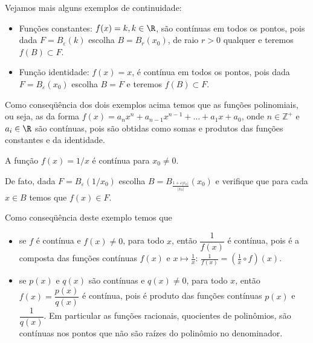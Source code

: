\documentclass{book}
\begin{document}
Vejamos mais alguns exemplos de continuidade:
\begin{itemize}
  \item Funções constantes: $f(x)=k, k\in\R$, são contínuas em todos os
  pontos, pois dada $F=B_\varepsilon(k)$ escolha $B=B_r(x_0)$, de raio
  $r>0$ qualquer e teremos $f(B)\subset F$.
  \item Função identidade: $f(x)=x$, é contínua em todos os pontos, pois
  dada $F=B_\varepsilon(x_0)$ escolha $B=F$ e teremos $f(B)\subset F$.
\end{itemize}

\begin{obs}
  Como conseqüência dos dois exemplos acima temos que as funções
  polinomiais, ou seja, as da forma
  $f(x)=a_nx^n+a_{n-1}x^{n-1}+\ldots+a_1x+a_0$, onde $n\in\mathbb{Z}^+$
  e $a_i \in \R$ são contínuas, pois são obtidas como somas e produtos
  das funções constantes e da identidade.
\end{obs}

\begin{exem}
  A função $f(x)=1\slash x$ é contínua para $x_0\ne 0$.

  De fato, dada $F=B_\varepsilon(1\slash x_0)$ escolha
  $B=B_{\frac{1+\varepsilon|x_0|}{|x_0|}}(x_0)$ e verifique que para
  cada $x\in B$ temos que $f(x)\in F$.
\end{exem}

\begin{obs}
  Como conseqüência deste exemplo temos que 
  \begin{itemize}
    \item se $f$ é contínua e $f(x)\ne 0$, para todo $x$, então
    $\dfrac{1}{f(x)}$ é contínua, pois é a composta das funções
    contínuas $f(x)$ e $x\mapsto \frac{1}{x}$:
    $\frac{1}{f(x)}=\left(\frac{1}{x}\circ f\right)(x)$.
    \item se $p(x)$ e $q(x)$ são contínuas e $q(x)\ne 0$, para todo $x$,
    então $f(x)=\dfrac{p(x)}{q(x)}$ é contínua, pois é produto das
    funções contínuas $p(x)$ e $\dfrac{1}{q(x)}$. Em particular as
    funções racionais, quocientes de polinômios, são contínuas nos
    pontos que não são raízes do polinômio no denominador.
  \end{itemize}
\end{obs}

\end{document}
